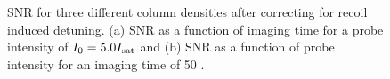 %
%


\begin{figure}
\caption{SNR for three different column densities after correcting for recoil induced detuning. (a) SNR as a function of imaging time for a probe intensity of $I_0=5.0 I_{\rm sat}$ and (b) SNR as a function of probe intensity for an imaging time of 50 \us{}.}
\label{fig:SNR}
\end{figure}

%
